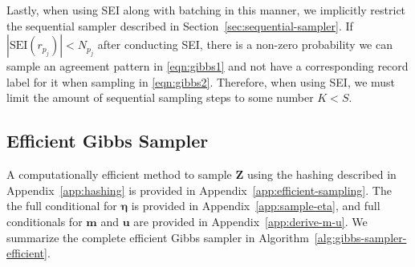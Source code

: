 \documentclass[12pt,letterpaper]{article}
\newcommand{\1}[1]{\mathbb{I}\!\left[#1\right]} %
\begin{document}
Lastly, when using SEI along with batching in this manner, we implicitly restrict the sequential sampler described in Section~\ref{sec:sequential-sampler}. If $|\text{SEI}(r_{p_j})| < N_{p_j}$ after conducting SEI, there is a non-zero probability we can sample an agreement pattern in \eqref{eqn:gibbs1} and not have a corresponding record label for it when sampling in \eqref{eqn:gibbs2}. Therefore, when using SEI, we must limit the amount of sequential sampling steps to some number $K < S$.

\subsection{Efficient Gibbs Sampler}\label{app:gibbs-sampler}

A computationally efficient method to sample $\bm{Z}$ using the hashing described in Appendix~\ref{app:hashing} is provided in Appendix~\ref{app:efficient-sampling}. The the full conditional for $\bm{\eta}$ is provided in Appendix~\ref{app:sample-eta}, and full conditionals for $\bm{m}$ and $\bm{u}$ are provided in Appendix~\ref{app:derive-m-u}. We summarize the complete efficient Gibbs sampler in Algorithm~\ref{alg:gibbs-sampler-efficient}.
\end{document}
